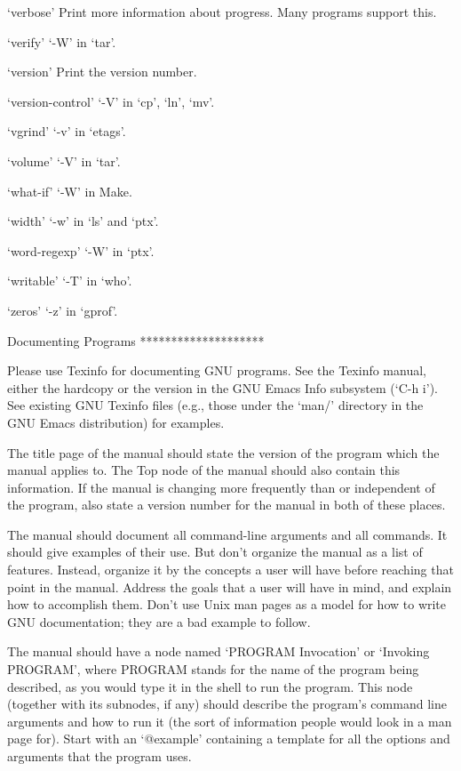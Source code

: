 `verbose'
     Print more information about progress.  Many programs support this.

`verify'
     `-W' in `tar'.

`version'
     Print the version number.

`version-control'
     `-V' in `cp', `ln', `mv'.

`vgrind'
     `-v' in `etags'.

`volume'
     `-V' in `tar'.

`what-if'
     `-W' in Make.

`width'
     `-w' in `ls' and `ptx'.

`word-regexp'
     `-W' in `ptx'.

`writable'
     `-T' in `who'.

`zeros'
     `-z' in `gprof'.

Documenting Programs
********************

   Please use Texinfo for documenting GNU programs.  See the Texinfo
manual, either the hardcopy or the version in the GNU Emacs Info
subsystem (`C-h i').  See existing GNU Texinfo files (e.g., those under
the `man/' directory in the GNU Emacs distribution) for examples.

   The title page of the manual should state the version of the program
which the manual applies to.  The Top node of the manual should also
contain this information.  If the manual is changing more frequently
than or independent of the program, also state a version number for the
manual in both of these places.

   The manual should document all command-line arguments and all
commands.  It should give examples of their use.  But don't organize
the manual as a list of features.  Instead, organize it by the concepts
a user will have before reaching that point in the manual.  Address the
goals that a user will have in mind, and explain how to accomplish
them.  Don't use Unix man pages as a model for how to write GNU
documentation; they are a bad example to follow.

   The manual should have a node named `PROGRAM Invocation' or
`Invoking PROGRAM', where PROGRAM stands for the name of the program
being described, as you would type it in the shell to run the program.
This node (together with its subnodes, if any) should describe the
program's command line arguments and how to run it (the sort of
information people would look in a man page for).  Start with an
`@example' containing a template for all the options and arguments that
the program uses.

